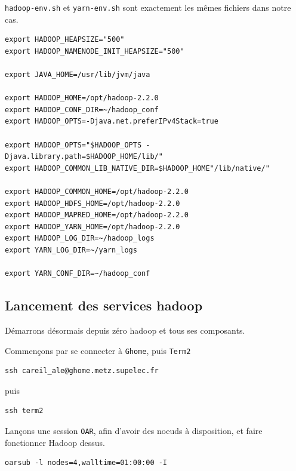 \par \texttt{hadoop-env.sh} et \texttt{yarn-env.sh} sont exactement les mêmes fichiers dans notre cas.

\begin{verbatim}
export HADOOP_HEAPSIZE="500"
export HADOOP_NAMENODE_INIT_HEAPSIZE="500"

export JAVA_HOME=/usr/lib/jvm/java

export HADOOP_HOME=/opt/hadoop-2.2.0
export HADOOP_CONF_DIR=~/hadoop_conf
export HADOOP_OPTS=-Djava.net.preferIPv4Stack=true

export HADOOP_OPTS="$HADOOP_OPTS -Djava.library.path=$HADOOP_HOME/lib/"
export HADOOP_COMMON_LIB_NATIVE_DIR=$HADOOP_HOME"/lib/native/"

export HADOOP_COMMON_HOME=/opt/hadoop-2.2.0
export HADOOP_HDFS_HOME=/opt/hadoop-2.2.0
export HADOOP_MAPRED_HOME=/opt/hadoop-2.2.0
export HADOOP_YARN_HOME=/opt/hadoop-2.2.0
export HADOOP_LOG_DIR=~/hadoop_logs
export YARN_LOG_DIR=~/yarn_logs

export YARN_CONF_DIR=~/hadoop_conf
\end{verbatim}


\subsection{Lancement des services hadoop}
\label{sec:lanc-des-serv}

\par Démarrons désormais depuis zéro hadoop et tous ses composants.

\par Commençons par se connecter à \texttt{Ghome}, puis \texttt{Term2}

\begin{verbatim}
ssh careil_ale@ghome.metz.supelec.fr
\end{verbatim}

puis

\begin{verbatim}
ssh term2
\end{verbatim}

\par Lançons une session \texttt{OAR}, afin d'avoir des noeuds à disposition, et faire fonctionner Hadoop dessus.

\begin{verbatim}
oarsub -l nodes=4,walltime=01:00:00 -I
\end{verbatim}

